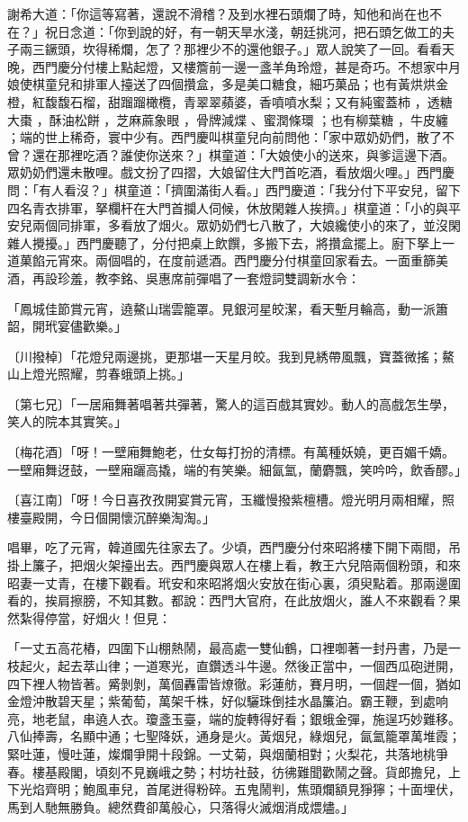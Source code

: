 謝希大道：「你這等寫著，還說不滑稽？及到水裡石頭爛了時，知他和尚在也不在？」祝日念道：「你到說的好，有一朝天旱水淺，朝廷挑河，把石頭乞做工的夫子兩三鐝頭，坎得稀爛，怎了？那裡少不的還他銀子。」眾人說笑了一回。看看天晚，西門慶分付樓上點起燈，又樓簷前一邊一盞羊角玲燈，甚是奇巧。不想家中月娘使棋童兒和排軍人擡送了四個攢盒，多是美口糖食，細巧菓品；也有黃烘烘金橙，紅馥馥石榴，甜蹓蹓橄欖，青翠翠蘋婆，香噴噴水梨；又有純蜜蓋柿 ，透糖大棗 ，酥油松餅 ，芝麻蔴象眼 ，骨牌減煠 、蜜潤條環 ；也有柳葉糖 ，牛皮纏 ；端的世上稀奇，寰中少有。西門慶叫棋童兒向前問他：「家中眾奶奶們，散了不曾？還在那裡吃酒？誰使你送來？」棋童道：「大娘使小的送來，與爹這邊下酒。眾奶奶們還未散哩。戲文扮了四摺，大娘留住大門首吃酒，看放烟火哩。」西門慶問：「有人看沒？」棋童道：「擠圍滿街人看。」西門慶道：「我分付下平安兒，留下四名青衣排軍，拏欄杆在大門首攔人伺候，休放閑雜人挨擠。」棋童道：「小的與平安兒兩個同排軍，多看放了烟火。眾奶奶們七八散了，大娘纔使小的來了，並沒閑雜人攪擾。」西門慶聽了，分付把桌上飲饌，多搬下去，將攢盒擺上。廚下拏上一道菓餡元宵來。兩個唱的，在度前遞酒。西門慶分付棋童回家看去。一面重篩美酒，再設珍羞，教李銘、吳惠席前彈唱了一套燈詞雙調新水令：

「鳳城佳節賞元宵，遶鰲山瑞雲籠罩。見銀河星皎潔，看天塹月輪高，動一派簫韶，開玳宴儘歡樂。」

〔川撥棹〕「花燈兒兩邊挑，更那堪一天星月皎。我到見綉帶風飄，寶蓋微搖；鰲山上燈光照耀，剪春蛾頭上挑。」

〔第七兄〕「一居廂舞著唱著共彈著，驚人的這百戲其實妙。動人的高戲怎生學，笑人的院本其實笑。」

〔梅花酒〕「呀！一壁廂舞鮑老，仕女每打扮的清標。有萬種妖嬈，更百媚千嬌。一壁廂舞迓鼓，一壁廂躧高撬，端的有笑樂。細氤氳，蘭麝飄，笑吟吟，飲香醪。」

〔喜江南〕「呀！今日喜孜孜開宴賞元宵，玉纖慢撥紫檀槽。燈光明月兩相耀，照樓臺殿開，今日個開懷沉醉樂淘淘。」

唱畢，吃了元宵，韓道國先往家去了。少頃，西門慶分付來昭將樓下開下兩間，吊掛上簾子，把烟火架擡出去。西門慶與眾人在樓上看，教王六兒陪兩個粉頭，和來昭妻一丈青，在樓下觀看。玳安和來昭將烟火安放在街心裏，須臾點着。那兩邊圍看的，挨肩擦膀，不知其數。都說：西門大官府，在此放烟火，誰人不來觀看？果然紮得停當，好烟火！但見：

「一丈五高花樁，四圍下山棚熱鬧，最高處一雙仙鶴，口裡啣著一封丹書，乃是一枝起火，起去萃山律；一道寒光，直鑽透斗牛邊。然後正當中，一個西瓜砲迸開，四下裡人物皆著。觱剝剝，萬個轟雷皆燎徹。彩蓮舫，賽月明，一個趕一個，猶如金燈沖散碧天星；紫葡萄，萬架千株，好似驪珠倒挂水晶簾泊。霸王鞭，到處响亮，地老鼠，串遶人衣。瓊盞玉臺，端的旋轉得好看；銀蛾金彈，施逞巧妙難移。八仙捧壽，名顯中通；七聖降妖，通身是火。黃烟兒，綠烟兒，氤氳籠罩萬堆霞；緊吐蓮，慢吐蓮，燦爛爭開十段錦。一丈菊，與烟蘭相對；火梨花，共落地桃爭春。樓基殿閣，頃刻不見巍峨之勢；村坊社鼓，彷彿難聞歡鬧之聲。貨郎擔兒，上下光焰齊明；鮑風車兒，首尾迸得粉碎。五鬼鬧判，焦頭爛額見猙獰；十面埋伏，馬到人馳無勝負。總然費卻萬般心，只落得火滅烟消成煨燼。」

